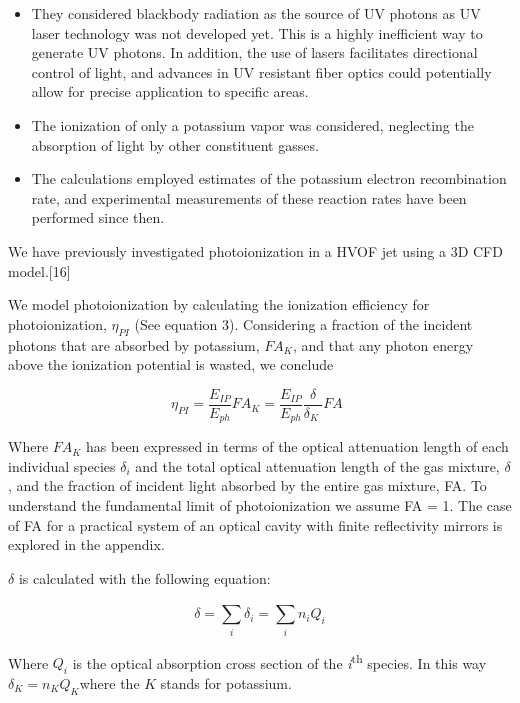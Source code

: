 \begin{itemize}
\item
  They considered blackbody radiation as the source of UV photons as UV laser technology was not developed yet. This is a highly inefficient way to generate UV photons. In addition, the use of lasers facilitates directional control of light, and advances in UV resistant fiber optics could potentially allow for precise application to specific areas.
\item
  The ionization of only a potassium vapor was considered, neglecting the absorption of light by other constituent gasses.
\item
  The calculations employed estimates of the potassium electron recombination rate, and experimental measurements of these reaction rates have been performed since then.
\end{itemize}

We have previously investigated photoionization in a HVOF jet using a 3D CFD model.{[}16{]}

We model photoionization by calculating the ionization efficiency for photoionization, \(\eta_{PI}\) (See equation 3). Considering a fraction of the incident photons that are absorbed by potassium, \(FA_{K}\), and that any photon energy above the ionization potential is wasted, we conclude

\begin{equation}
\eta_{PI} = \frac{E_{IP}}{E_{ph}}FA_{K} = \frac{E_{IP}}{E_{ph}}\frac{\delta}{\delta_{K}\ }FA\ \ 
\end{equation}

Where \(FA_{K}\) has been expressed in terms of the optical attenuation length of each individual species \(\delta_{i}\) and the total optical attenuation length of the gas mixture, \(\delta\), and the fraction of incident light absorbed by the entire gas mixture, FA. To understand the fundamental limit of photoionization we assume FA = 1. The case of FA for a practical system of an optical cavity with finite reflectivity mirrors is explored in the appendix.

\(\delta\) is calculated with the following equation:

\begin{equation}
\delta = \sum_{i}^{}\delta_{i} = \sum_{i}^{}{n_{i}Q_{i}}
\end{equation}

Where \(Q_{i}\) is the optical absorption cross section of the \emph{i}\textsuperscript{th} species. In this way \(\delta_{K} = n_{K}Q_{K}\)where the \(K\) stands for potassium.

